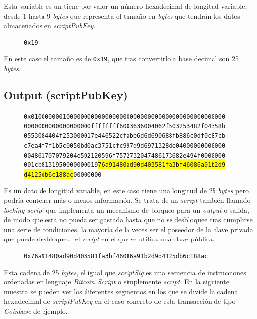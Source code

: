 \documentclass{article}
\begin{document}
    Esta variable es un tiene por valor un número hexadecimal de longitud variable, desde 1 hasta 9 \textit{bytes} que representa el tamaño en \textit{bytes} que tendrán los datos almacenados en \textit{scriptPubKey}.
    \begin{figure}[H]
        \texttt{0x19}
    \end{figure}
    En este caso el tamaño es de \texttt{0x19}, que tras convertirlo a base decimal son 25 \textit{bytes}.
    
    \subsection{Output (scriptPubKey)}
    
    \begin{figure}[H]
        \texttt{0x0100000001000000000000000000000000000000000000000000000} \\
        \texttt{0000000000000000000ffffffff6003636004062f503253482f04358b} \\
        \texttt{0553084404f253000017e446522cfabe6d6d690688fb886c0df0c87cb} \\
        \texttt{c7ea4f7f1b5c0050bd0ac3751cfc997d9d6971328de04000000000000} \\
        \texttt{004861707079204e592120596f7572732047486173682e494f0000000} \\
        \texttt{001cb8131950000000019\colorbox{Yellow}{76a91480ad90d403581fa3bf46086a91b2d9}} \\
        \texttt{\colorbox{Yellow}{d4125db6c188ac}00000000}
    \end{figure}
    
    Es un dato de longitud variable, en este caso tiene una longitud de 25 \textit{bytes} pero podría contener más o menos información. Se trata de un \textit{script} también llamado \textit{locking script} que implementa un mecanismo de bloqueo para un \textit{output} o salida, de modo que esta no pueda ser gastada hasta que no se desbloquee tras cumplirse una serie de condiciones, la mayoría de la veces ser el poseedor de la clave privada que puede desbloquear el \textit{script} en el que se utiliza una clave pública.
    
    \begin{figure}[H]
        \texttt{0x76a91480ad90d403581fa3bf46086a91b2d9d4125db6c188ac}
    \end{figure}
    
    Esta cadena de 25 \textit{bytes}, el igual que \textit{scriptSig} es una secuencia de instrucciones ordenadas en lenguaje \textit{Bitcoin Script} o simplemente \textit{script}. En la siguiente muestra se pueden ver los diferentes segmentos en los que se divide la cadena hexadecimal de \textit{scriptPubKey} en el caso concreto de esta transacción de tipo \textit{Coinbase} de ejemplo.
    
\end{document}
